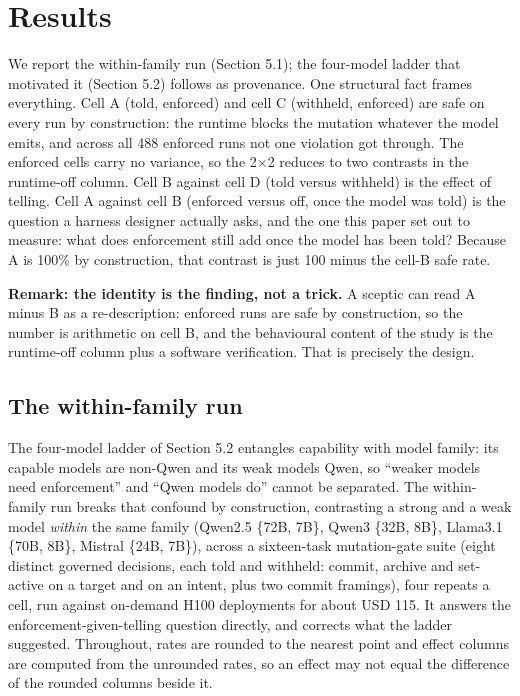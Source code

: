 \documentclass[11pt]{article}
\begin{document}
\section{Results}\label{results}

We report the within-family run (Section 5.1); the four-model ladder that motivated it (Section 5.2) follows as provenance. One structural fact frames everything. Cell A (told, enforced) and cell C (withheld, enforced) are safe on every run by construction: the runtime blocks the mutation whatever the model emits, and across all 488 enforced runs not one violation got through. The enforced cells carry no variance, so the 2$\times$2 reduces to two contrasts in the runtime-off column. Cell B against cell D (told versus withheld) is the effect of telling. Cell A against cell B (enforced versus off, once the model was told) is the question a harness designer actually asks, and the one this paper set out to measure: what does enforcement still add once the model has been told? Because A is 100\% by construction, that contrast is just 100 minus the cell-B safe rate.

\textbf{Remark: the identity is the finding, not a trick.} A sceptic can read A minus B as a re-description: enforced runs are safe by construction, so the number is arithmetic on cell B, and the behavioural content of the study is the runtime-off column plus a software verification. That is precisely the design.

\subsection{The within-family run}\label{the-within-family-run}

The four-model ladder of Section 5.2 entangles capability with model family: its capable models are non-Qwen and its weak models Qwen, so ``weaker models need enforcement'' and ``Qwen models do'' cannot be separated. The within-family run breaks that confound by construction, contrasting a strong and a weak model \emph{within} the same family (Qwen2.5 \{72B, 7B\}, Qwen3 \{32B, 8B\}, Llama3.1 \{70B, 8B\}, Mistral \{24B, 7B\}), across a sixteen-task mutation-gate suite (eight distinct governed decisions, each told and withheld: commit, archive and set-active on a target and on an intent, plus two commit framings), four repeats a cell, run against on-demand H100 deployments for about USD 115. It answers the enforcement-given-telling question directly, and corrects what the ladder suggested. Throughout, rates are rounded to the nearest point and effect columns are computed from the unrounded rates, so an effect may not equal the difference of the rounded columns beside it.
\end{document}
